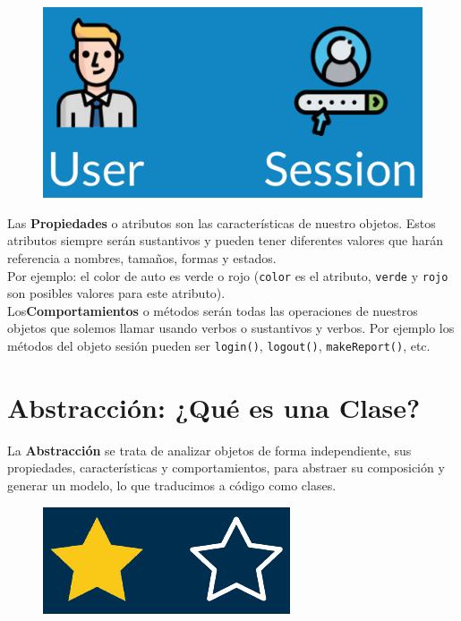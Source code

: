 \documentclass{article}
\begin{document}
\begin{figure}[h!]
  \centering
  \includegraphics[scale=0.45]{./Pictures/004_objetos.png}
\end{figure}

Las \textbf{Propiedades} o atributos son las características de nuestro
objetos. Estos atributos siempre serán sustantivos y pueden tener diferentes
valores que harán referencia a nombres, tamaños, formas y estados.\\

Por ejemplo: el color de auto es verde o rojo (\texttt{color} es el atributo,
\texttt{verde} y \texttt{rojo} son posibles valores para este atributo).\\

Los\textbf{Comportamientos} o métodos serán todas las operaciones de nuestros
objetos que solemos llamar usando verbos o sustantivos y verbos. Por ejemplo
los métodos del objeto sesión pueden ser \texttt{login()}, \texttt{logout()},
\texttt{makeReport()}, etc.


\section{Abstracción: ¿Qué es una Clase?}%
La \textbf{Abstracción} se trata de analizar objetos de forma independiente, sus
propiedades, características y comportamientos, para abstraer su composición y
generar un modelo, lo que traducimos a código como clases.\\

\begin{figure}[h!]
  \centering
  \includegraphics[scale=0.5]{./Pictures/005_clases_objetos.png}
\end{figure}
\end{document}
